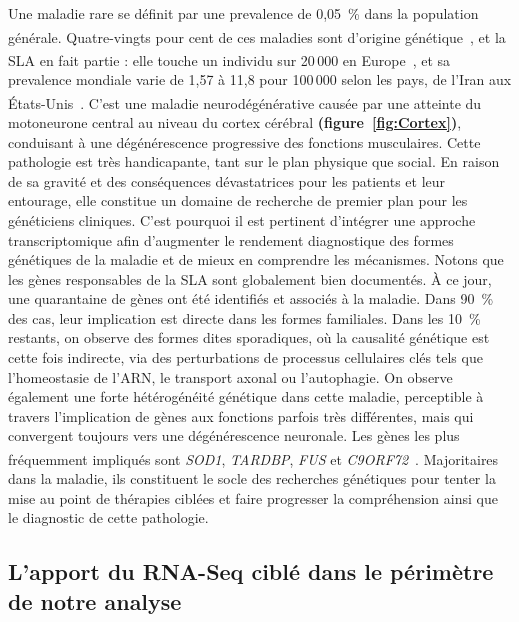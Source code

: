 Une maladie rare se définit par une \gls{prevalence} de 0,05~\% dans la population générale.  
Quatre-vingts pour cent de ces maladies sont d’origine génétique~\textsuperscript{\cite{centre_constitutif_sla_de_tours_protocole_2020}},  
et la SLA en fait partie : elle touche un individu sur 20\,000 en Europe~\textsuperscript{\cite{orphanet_prevalence_2023}},  
et sa prevalence mondiale varie de 1{,}57 à 11{,}8 pour 100\,000 selon les pays, de l’Iran aux États-Unis~\textsuperscript{\cite{c_wolfson_et_al_global_2023}}.  
C’est une maladie neurodégénérative causée par une atteinte du motoneurone central au niveau du cortex cérébral \textbf{(figure~\ref{fig:Cortex})},  
conduisant à une dégénérescence progressive des fonctions musculaires. Cette pathologie est très handicapante, tant sur le plan physique que social.  
En raison de sa gravité et des conséquences dévastatrices pour les patients et leur entourage, elle constitue un domaine de recherche de premier plan pour les généticiens cliniques.  
C’est pourquoi il est pertinent d’intégrer une approche transcriptomique afin d’augmenter le rendement diagnostique des formes génétiques de la maladie et de mieux en comprendre les mécanismes.
Notons que les gènes responsables de la SLA sont globalement bien documentés. À ce jour, une quarantaine de gènes ont été identifiés et associés à la maladie.  
Dans 90~\% des cas, leur implication est directe dans les formes familiales. Dans les 10~\% restants, on observe des formes dites sporadiques,  
où la causalité génétique est cette fois indirecte, via des perturbations de processus cellulaires clés tels que l’\gls{homeostasie} de l’ARN, le \gls{transport axonal} ou l’\gls{autophagie}.    
On observe également une forte hétérogénéité génétique dans cette maladie, perceptible à travers l’implication de gènes aux fonctions parfois très différentes,  
mais qui convergent toujours vers une dégénérescence neuronale. Les gènes les plus fréquemment impliqués sont \textit{SOD1}, \textit{TARDBP}, \textit{FUS} et \textit{C9ORF72}~\textsuperscript{\cite{centre_constitutif_sla_de_tours_protocole_2020}}.  
Majoritaires dans la maladie, ils constituent le socle des recherches génétiques pour tenter la mise au point de thérapies ciblées et faire progresser la compréhension ainsi que le diagnostic de cette pathologie.

\subsection{L’apport du RNA-Seq ciblé dans le périmètre de notre analyse}

